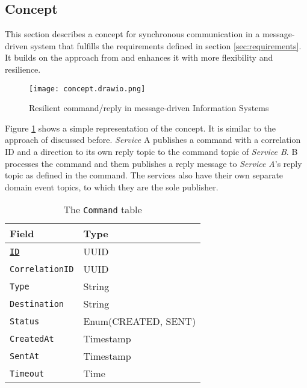 \subsection{Concept}

This section describes a concept for synchronous communication in a message-driven system that fulfills the requirements defined in section \ref{sec:requirements}.
It builds on the approach from \cite{richardson_microservices_2019} and enhances it with more flexibility and resilience.

\begin{figure}[H]
  \centering
  \texttt{[image: concept.drawio.png]}
  \caption{Resilient command/reply in message-driven Information Systems}\label{fig:concept}
\end{figure}

Figure \ref{fig:concept} shows a simple representation of the concept.
It is similar to the approach of \cite[]{richardson_microservices_2019} discussed before.
\emph{Service} A publishes a command with a correlation ID and a direction to its own reply topic to the command topic of \emph{Service B}.
B processes the command and them publishes a reply message to \emph{Service A}'s reply topic as defined in the command.
The services also have their own separate domain event topics, to which they are the sole publisher.

\begin{table}
  \centering
  \begin{tabu}{| l | l |}\hline
    \textbf{Field}          & \textbf{Type}       \\\hline
    \texttt{\underline{ID}} & UUID                \\\hline
    \texttt{CorrelationID}  & UUID                \\\hline
    \texttt{Type}           & String              \\\hline
    \texttt{Destination}    & String              \\\hline
    \texttt{Status}         & Enum(CREATED, SENT) \\\hline
    \texttt{CreatedAt}      & Timestamp           \\\hline
    \texttt{SentAt}         & Timestamp           \\\hline
    \texttt{Timeout}        & Time                \\\hline
  \end{tabu}
  \caption{The \texttt{Command} table}\label{tab:command-datamodel}
\end{table}

